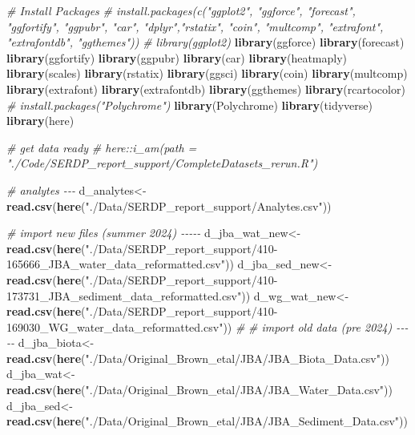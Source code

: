 \documentclass[
]{article}
\newenvironment{Shaded}{\begin{snugshade}}{\end{snugshade}}
\newcommand{\CommentTok}[1]{\textcolor[rgb]{0.56,0.35,0.01}{\textit{#1}}}
\newcommand{\FunctionTok}[1]{\textcolor[rgb]{0.13,0.29,0.53}{\textbf{#1}}}
\newcommand{\NormalTok}[1]{#1}
\newcommand{\OtherTok}[1]{\textcolor[rgb]{0.56,0.35,0.01}{#1}}
\newcommand{\StringTok}[1]{\textcolor[rgb]{0.31,0.60,0.02}{#1}}
\begin{document}
\begin{Shaded}
\begin{Highlighting}[]
\CommentTok{\# Install Packages}
\CommentTok{\# install.packages(c("ggplot2", "ggforce", "forecast", "ggfortify", "ggpubr", "car", "dplyr","rstatix", "coin", "multcomp", "extrafont", "extrafontdb", "ggthemes"))}
\CommentTok{\# library(ggplot2)}
\FunctionTok{library}\NormalTok{(ggforce)}
\FunctionTok{library}\NormalTok{(forecast)}
\FunctionTok{library}\NormalTok{(ggfortify)}
\FunctionTok{library}\NormalTok{(ggpubr)}
\FunctionTok{library}\NormalTok{(car)}
\FunctionTok{library}\NormalTok{(heatmaply)}
\FunctionTok{library}\NormalTok{(scales)}
\FunctionTok{library}\NormalTok{(rstatix)}
\FunctionTok{library}\NormalTok{(ggsci)}
\FunctionTok{library}\NormalTok{(coin)}
\FunctionTok{library}\NormalTok{(multcomp)}
\FunctionTok{library}\NormalTok{(extrafont)}
\FunctionTok{library}\NormalTok{(extrafontdb)}
\FunctionTok{library}\NormalTok{(ggthemes)}
\FunctionTok{library}\NormalTok{(rcartocolor)}
\CommentTok{\# install.packages("Polychrome")}
\FunctionTok{library}\NormalTok{(Polychrome)}
\FunctionTok{library}\NormalTok{(tidyverse)}
\FunctionTok{library}\NormalTok{(here)}

\CommentTok{\# get data ready}
\CommentTok{\# here::i\_am(path = "./Code/SERDP\_report\_support/CompleteDatasets\_rerun.R")}

\CommentTok{\# analytes {-}{-}{-}}
\NormalTok{d\_analytes}\OtherTok{\textless{}{-}}\FunctionTok{read.csv}\NormalTok{(}\FunctionTok{here}\NormalTok{(}\StringTok{"./Data/SERDP\_report\_support/Analytes.csv"}\NormalTok{))}

\CommentTok{\# import new files (summer 2024) {-}{-}{-}{-}{-}}
\NormalTok{d\_jba\_wat\_new}\OtherTok{\textless{}{-}}\FunctionTok{read.csv}\NormalTok{(}\FunctionTok{here}\NormalTok{(}\StringTok{"./Data/SERDP\_report\_support/410{-}165666\_JBA\_water\_data\_reformatted.csv"}\NormalTok{))}
\NormalTok{d\_jba\_sed\_new}\OtherTok{\textless{}{-}}\FunctionTok{read.csv}\NormalTok{(}\FunctionTok{here}\NormalTok{(}\StringTok{"./Data/SERDP\_report\_support/410{-}173731\_JBA\_sediment\_data\_reformatted.csv"}\NormalTok{))}
\NormalTok{d\_wg\_wat\_new}\OtherTok{\textless{}{-}}\FunctionTok{read.csv}\NormalTok{(}\FunctionTok{here}\NormalTok{(}\StringTok{"./Data/SERDP\_report\_support/410{-}169030\_WG\_water\_data\_reformatted.csv"}\NormalTok{))}
\CommentTok{\#}
\CommentTok{\# import old data (pre 2024) {-}{-}{-}{-}{-}}
\NormalTok{d\_jba\_biota}\OtherTok{\textless{}{-}}\FunctionTok{read.csv}\NormalTok{(}\FunctionTok{here}\NormalTok{(}\StringTok{"./Data/Original\_Brown\_etal/JBA/JBA\_Biota\_Data.csv"}\NormalTok{))}
\NormalTok{d\_jba\_wat}\OtherTok{\textless{}{-}}\FunctionTok{read.csv}\NormalTok{(}\FunctionTok{here}\NormalTok{(}\StringTok{"./Data/Original\_Brown\_etal/JBA/JBA\_Water\_Data.csv"}\NormalTok{))}
\NormalTok{d\_jba\_sed}\OtherTok{\textless{}{-}}\FunctionTok{read.csv}\NormalTok{(}\FunctionTok{here}\NormalTok{(}\StringTok{"./Data/Original\_Brown\_etal/JBA/JBA\_Sediment\_Data.csv"}\NormalTok{))}


\end{Highlighting}
\end{Shaded}
\end{document}
